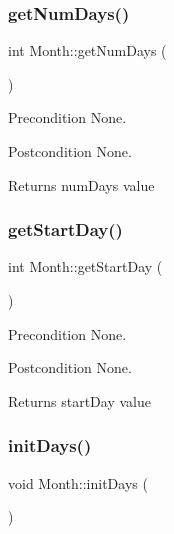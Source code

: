 \subsubsection{\texorpdfstring{get\+Num\+Days()}{getNumDays()}}
{\footnotesize\ttfamily int Month\+::get\+Num\+Days (\begin{DoxyParamCaption}{ }\end{DoxyParamCaption})}

\begin{DoxyPrecond}{Precondition}
None. 
\end{DoxyPrecond}
\begin{DoxyPostcond}{Postcondition}
None. 
\end{DoxyPostcond}
\begin{DoxyReturn}{Returns}
num\+Days value 
\end{DoxyReturn}
\hypertarget{class_month_a5fd5d2bf55df35f09262198e416e1906}{}\label{class_month_a5fd5d2bf55df35f09262198e416e1906} 
\subsubsection{\texorpdfstring{get\+Start\+Day()}{getStartDay()}}
{\footnotesize\ttfamily int Month\+::get\+Start\+Day (\begin{DoxyParamCaption}{ }\end{DoxyParamCaption})}

\begin{DoxyPrecond}{Precondition}
None. 
\end{DoxyPrecond}
\begin{DoxyPostcond}{Postcondition}
None. 
\end{DoxyPostcond}
\begin{DoxyReturn}{Returns}
start\+Day value 
\end{DoxyReturn}
\hypertarget{class_month_a9309f01ffc97e5bbb13bf8f5801f2aec}{}\label{class_month_a9309f01ffc97e5bbb13bf8f5801f2aec} 
\subsubsection{\texorpdfstring{init\+Days()}{initDays()}}
{\footnotesize\ttfamily void Month\+::init\+Days (\begin{DoxyParamCaption}{ }\end{DoxyParamCaption})}


